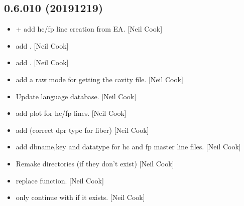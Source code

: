 \documentclass[a4paper,10pt,english]{report}
\begin{document}
\subsection{0.6.010 (2019\sphinxhyphen{}12\sphinxhyphen{}19)}
\label{\detokenize{misc/changelog:id27}}\begin{itemize}
\item {} 
 +  \sphinxhyphen{} add
hc/fp line creation from EA. {[}Neil Cook{]}

\item {} 
 \sphinxhyphen{} add .
{[}Neil Cook{]}

\item {} 
 \sphinxhyphen{} add . {[}Neil Cook{]}

\item {} 
 \sphinxhyphen{} add a raw mode for getting the cavity file. {[}Neil
Cook{]}

\item {} 
Update language database. {[}Neil Cook{]}

\item {} 
 \sphinxhyphen{} add plot  for hc/fp
lines. {[}Neil Cook{]}

\item {} 
 \sphinxhyphen{} add  (correct dpr
type for fiber) {[}Neil Cook{]}

\item {} 
 \sphinxhyphen{} add dbname,key and
datatype for hc and fp master line files. {[}Neil Cook{]}

\item {} 
Re\sphinxhyphen{}make directories (if they don’t exist) {[}Neil Cook{]}

\item {} 
 \sphinxhyphen{} replace  function. {[}Neil Cook{]}

\item {} 
 \sphinxhyphen{} only continue with  if it
exists. {[}Neil Cook{]}


\end{itemize}
\end{document}
